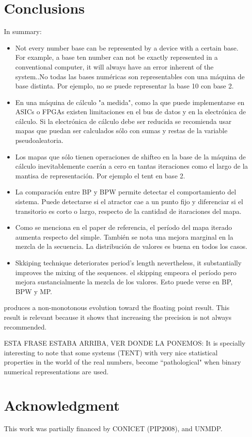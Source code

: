 \section{Conclusions}\label{sec:conclusions}
In summary:
\begin{itemize}
  \item Not every number base can be represented by a device with a certain base. For example, a base ten number can not be exactly represented in a conventional computer, it will always have an error inherent of the system..No todas las bases numéricas son representables con una máquina de base distinta. Por ejemplo, no se puede representar la base 10 con base 2.
  \item En una máquina de cálculo "a medida", como la que puede implementarse en ASICs o FPGAs existen limitaciones en el bus de datos y en la electrónica de cálculo. Si la electrónica de cálculo debe ser reducida se recomienda usar mapas que puedan ser calculados sólo con sumas y restas de la variable pseudoaleatoria.
  \item Los mapas que sólo tienen operaciones de shifteo en la base de la máquina de cálculo inevitablemente caerán a cero en tantas iteraciones como el largo de la mantisa de representación. Por ejemplo el tent en base 2.
  \item La comparación entre BP y BPW permite detectar el comportamiento del sistema. Puede detectarse si el atractor cae a un punto fijo y diferenciar si el transitorio es corto o largo, respecto de la cantidad de itaraciones del mapa.
  \item Como se menciona en el paper de referencia, el período del mapa iterado aumenta respecto del simple. También se nota una mejora marginal en la mezcla de la secuencia. La distribución de valores es buena en todos los casos.
  \item Skkiping technique deteriorates period's length nevertheless, it substantially improves the mixing of the sequences.  el skipping empeora el período pero mejora sustancialmente la mezcla de los valores. Esto puede verse en BP, BPW y MP.
\end{itemize}

produces a non-monotonous evolution toward the floating point result. This result is relevant because it shows that increasing the precision is not
always recommended.

ESTA FRASE ESTABA ARRIBA, VER DONDE LA PONEMOS: It is specially interesting to note that some systems (TENT) with very nice statistical properties in the world of the real numbers, become ``pathological" when binary numerical representations are used.

\section*{Acknowledgment}
This work was partially financed by CONICET (PIP2008),  and UNMDP.
